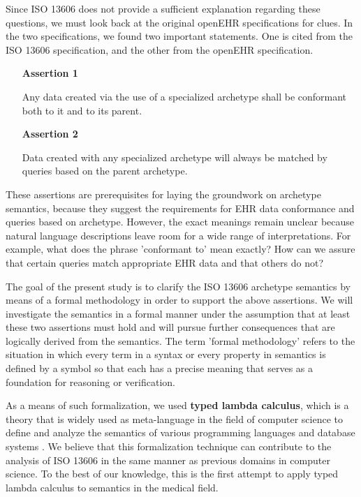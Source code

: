 \documentclass[preprint,3p,onecolumn,times,review]{elsarticle}
\begin{document}
Since ISO 13606 does not provide a sufficient explanation regarding these questions, we must look back at the original openEHR specifications for clues.
In the two specifications, we found two important statements. One is cited from the ISO 13606 specification, and the other from the openEHR specification.

\begin{enumerate}[Assertion 1.]
\item[{\bf Assertion 1}]

  Any data created via the use of a specialized archetype shall be conformant both to it and to its parent\cite[viii]{iso08:13606_healt_elect_part2}.
\item[{\bf Assertion 2}]

  Data created with any specialized archetype will always be matched by queries based on the parent archetype\cite[p.51]{beale08:_openeh_archit_overv}.
\end{enumerate}

These assertions are prerequisites for laying the groundwork on archetype semantics, because they suggest the requirements for EHR data conformance and queries based on archetype.
However, the exact meanings remain unclear because natural language descriptions leave room for a wide range of interpretations.
For example, what does the phrase 'conformant to' mean exactly? How can we assure that certain queries match appropriate EHR data and that others do not?


The goal of the present study is to clarify the ISO 13606 archetype semantics by means of a formal methodology in order to support the above assertions. We will investigate the semantics in a formal manner under the assumption that at least these two assertions must hold and will pursue further consequences that are logically derived from the semantics.
The term 'formal methodology' refers to the situation in which every term in a syntax or every property in semantics is defined by a symbol so that each has a precise meaning that serves as a foundation for reasoning or verification. 

As a means of such formalization, we used {\bf typed lambda calculus}, which is a theory that is widely used as meta-language in the field of computer science to define and analyze the semantics of various programming languages and database systems \cite{ohori89:_simpl_seman_ml_polym,igarashi01:_feath_java}.
We believe that this formalization technique can contribute to the analysis of ISO 13606 in the same manner as previous domains in computer science.
To the best of our knowledge, this is the first attempt to apply typed lambda calculus to semantics in the medical field.
\end{document}
